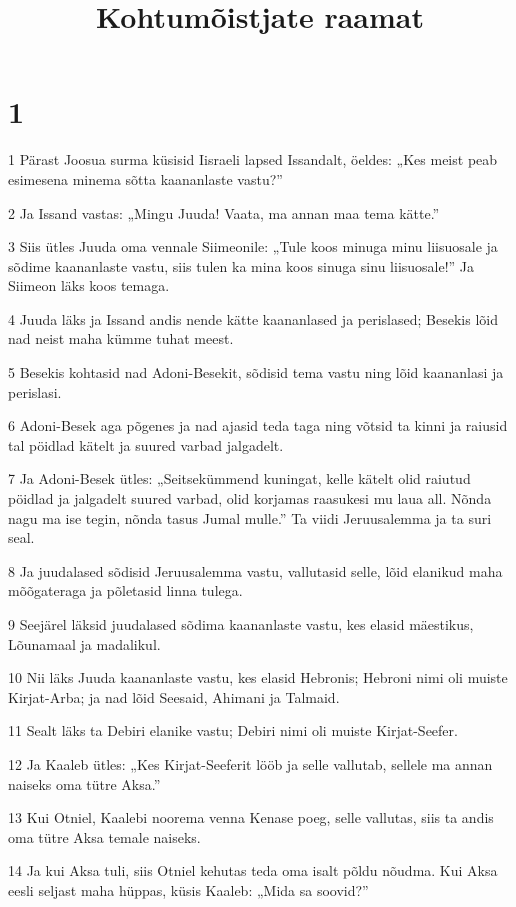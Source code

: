 

\title{Kohtumõistjate raamat}

\chapter{1}

\par 1 Pärast Joosua surma küsisid Iisraeli lapsed Issandalt, öeldes: „Kes meist peab esimesena minema sõtta kaananlaste vastu?”
\par 2 Ja Issand vastas: „Mingu Juuda! Vaata, ma annan maa tema kätte.”
\par 3 Siis ütles Juuda oma vennale Siimeonile: „Tule koos minuga minu liisuosale ja sõdime kaananlaste vastu, siis tulen ka mina koos sinuga sinu liisuosale!” Ja Siimeon läks koos temaga.
\par 4 Juuda läks ja Issand andis nende kätte kaananlased ja perislased; Besekis lõid nad neist maha kümme tuhat meest.
\par 5 Besekis kohtasid nad Adoni-Besekit, sõdisid tema vastu ning lõid kaananlasi ja perislasi.
\par 6 Adoni-Besek aga põgenes ja nad ajasid teda taga ning võtsid ta kinni ja raiusid tal pöidlad kätelt ja suured varbad jalgadelt.
\par 7 Ja Adoni-Besek ütles: „Seitsekümmend kuningat, kelle kätelt olid raiutud pöidlad ja jalgadelt suured varbad, olid korjamas raasukesi mu laua all. Nõnda nagu ma ise tegin, nõnda tasus Jumal mulle.” Ta viidi Jeruusalemma ja ta suri seal.
\par 8 Ja juudalased sõdisid Jeruusalemma vastu, vallutasid selle, lõid elanikud maha mõõgateraga ja põletasid linna tulega.
\par 9 Seejärel läksid juudalased sõdima kaananlaste vastu, kes elasid mäestikus, Lõunamaal ja madalikul.
\par 10 Nii läks Juuda kaananlaste vastu, kes elasid Hebronis; Hebroni nimi oli muiste Kirjat-Arba; ja nad lõid Seesaid, Ahimani ja Talmaid.
\par 11 Sealt läks ta Debiri elanike vastu; Debiri nimi oli muiste Kirjat-Seefer.
\par 12 Ja Kaaleb ütles: „Kes Kirjat-Seeferit lööb ja selle vallutab, sellele ma annan naiseks oma tütre Aksa.”
\par 13 Kui Otniel, Kaalebi noorema venna Kenase poeg, selle vallutas, siis ta andis oma tütre Aksa temale naiseks.
\par 14 Ja kui Aksa tuli, siis Otniel kehutas teda oma isalt põldu nõudma. Kui Aksa eesli seljast maha hüppas, küsis Kaaleb: „Mida sa soovid?”
